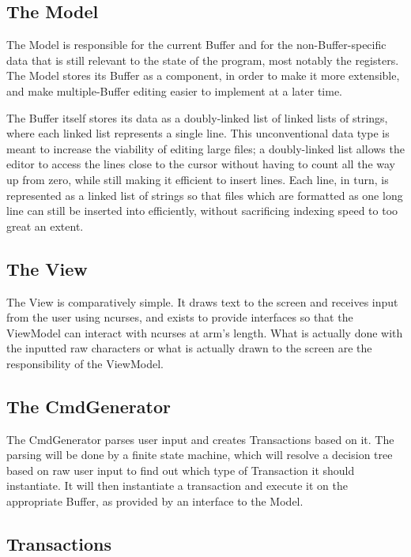 \documentclass[12pt]{article}
\begin{document}
\subsection{The Model}

The Model is responsible for the current Buffer and for the non-Buffer-specific
data that is still relevant to the state of the program, most notably the registers.
The Model stores its Buffer as a component, in order to make it more extensible,
and make multiple-Buffer editing easier to implement at a later time.

The Buffer itself stores its data as a doubly-linked list of linked lists of strings,
where each linked list represents a single line. This unconventional data type is meant
to increase the viability of editing large files; a doubly-linked list allows the
editor to access the lines close to the cursor without having to count all the way
up from zero, while still making it efficient to insert lines. Each line, in turn,
is represented as a linked list of strings so that files which are formatted as one 
long line can still be inserted into efficiently, without sacrificing indexing speed
to too great an extent.

\subsection{The View}

The View is comparatively simple. It draws text to the screen and receives input
from the user using ncurses, and exists to provide interfaces so that the ViewModel
can interact with ncurses at arm's length. What is actually done with the inputted raw
characters or what is actually drawn to the screen are the responsibility of the ViewModel.

\subsection{The CmdGenerator}

The CmdGenerator parses user input and creates Transactions based on it. The parsing will
be done by a finite state machine, which will resolve a decision tree based on raw user
input to find out which type of Transaction it should instantiate. It will then instantiate
a transaction and execute it on the appropriate Buffer, as provided by an interface to the
Model.

\subsection{Transactions}
\end{document}
